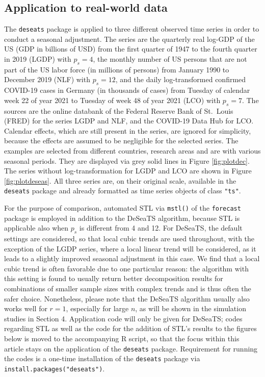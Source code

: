 \subsection{Application to real-world data}\label{sec:applicationreal}

The \texttt{deseats} package is applied to three different observed time series in order to conduct a seasonal adjustment. The series are the quarterly real log-GDP of the US (GDP in billions of USD) from the first quarter of 1947 to the fourth quarter in 2019 (LGDP) with \(p_s = 4\), the monthly number of US persons that are not part of the US labor force (in millions of persons) from January 1990 to December 2019 (NLF) with \(p_s = 12\), and the daily log-transformed confirmed COVID-19 cases in Germany (in thousands of cases) from Tuesday of calendar week 22 of year 2021 to Tuesday of week 48 of year 2021 (LCO) with \(p_s = 7\). The sources are the online databank of the Federal Reserve Bank of St.~Louis (FRED) for the series LGDP and NLF, and the COVID-19 Data Hub for LCO. Calendar effects, which are still present in the series, are ignored for simplicity, because the effects are assumed to be negligible for the selected series. The examples are selected from different countries, research areas and are with various seasonal periods. They are displayed via grey solid lines in Figure \ref{fig:plotdec}. The series without log-transformation for LGDP and LCO are shown in Figure \ref{fig:plotdeseas}. All three series are, on their original scale, available in the \texttt{deseats} package and already formatted as time series objects of class \texttt{"ts"}.

For the purpose of comparison, automated STL via \texttt{mstl()} of the \texttt{forecast} package is employed in addition to the DeSeaTS algorithm, because STL is applicable also when \(p_s\) is different from 4 and 12. For DeSeaTS, the default settings are considered, so that local cubic trends are used throughout, with the exception of the LGDP series, where a local linear trend will be considered, as it leads to a slightly improved seasonal adjustment in this case. We find that a local cubic trend is often favorable due to one particular reason: the algorithm with this setting is found to usually return better decomposition results for combinations of smaller sample sizes with complex trends and is thus often the safer choice. Nonetheless, please note that the DeSeaTS algorithm usually also works well for \(r=1\), especially for large \(n\), as will be shown in the simulation studies in Section 4. Application code will only be given for DeSeaTS; codes regarding STL as well as the code for the addition of STL's results to the figures below is moved to the accompanying R script, so that the focus within this article stays on the application of the \texttt{deseats} package. Requirement for running the codes is a one-time installation of the \texttt{deseats} package via \texttt{install.packages("deseats")}.

